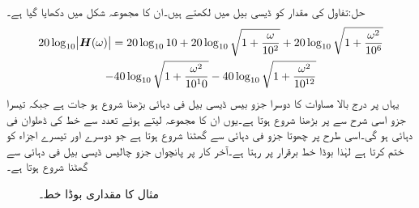 حل:تفاول کی مقدار کو ڈیسی بیل میں لکھتے ہیں۔ان کا مجموعہ شکل  میں دکھایا گیا ہے۔
\begin{multline*}
20\log_{10}\abs{{{\boldsymbol{H}}}(\omega)}=20\log_{10} 10 +20\log_{10} \sqrt{1+\frac{\omega}{10^2}}+20\log_{10}\sqrt{1+\frac{\omega^2}{10^6}} \\
-40\log_{10}\sqrt{1+\frac{\omega^2}{10^10}}-40\log_{10}\sqrt{1+\frac{\omega^2}{10^{12}}}
\end{multline*}
یہاں  پر درج بالا مساوات کا دوسرا جزو بیس ڈیسی بیل فی دہائی بڑھنا شروع ہو جات ہے جبکہ تیسرا جزو اسی شرح سے  پر بڑھنا شروع ہوتا ہے۔یوں ان کا مجموعہ لیتے ہوئے  تعدد سے خط کی ڈھلوان  فی دہائی ہو گی۔اسی طرح  پر چھوتا جزو  فی دہائی سے گھٹنا شروع ہوتا ہے جو دوسرے اور تیسرے اجزاء کو ختم کرتا ہے لہٰذا بوڈا خط برقرار  پر رہتا ہے۔آخر کار  پر پانچواں جزو چالیس ڈیسی بیل فی دہائی سے گھٹنا شروع ہوتا ہے۔ 
\begin{figure}
\centering
{}
\caption{مثال  کا مقداری بوڈا خط۔}
\label{شکل_تعددی_چالیس_ڈیسی_بیل_ڈھلوان}
\end{figure}

